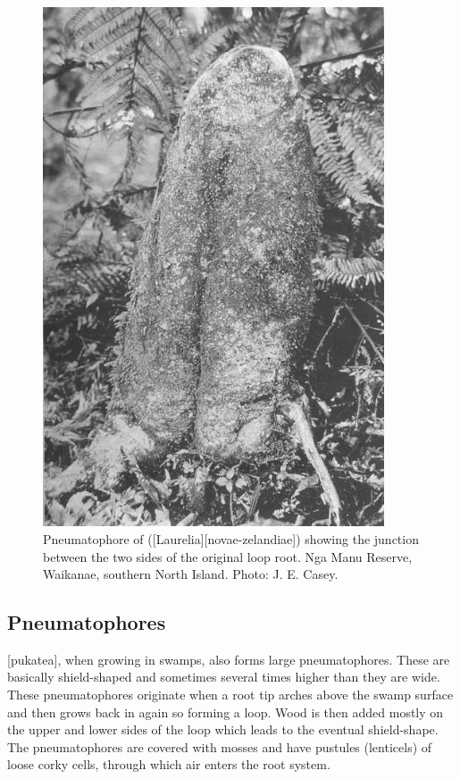 \begin{figure}[!htb]
\begin{minipage}[t]{0.44\textwidth}
    	\includegraphics[width=0.9\textwidth]{graphics/figure11pukatea.jpg}
    	\caption[Pneumatophore of pukatea showing the junction between the two sides of the original loop root]{Pneumatophore of  ([Laurelia][novae-zelandiae]) showing the junction between the two sides of the original loop root.
    	Nga Manu Reserve, Waikanae, southern North Island.
    	Photo:  J. E. Casey.}%
    	\label{fig:11pukatea}
	\end{minipage}
\end{figure}

\subsection{Pneumatophores}

[pukatea], when growing in swamps, also forms large pneumatophores.
These are basically shield-shaped and sometimes several times higher than they are wide.
These pneumatophores originate when a root tip arches above the swamp surface and then grows back in again so forming a loop.
Wood is then added mostly on the upper and lower sides of the loop which leads to the eventual shield-shape.
The pneumatophores are covered with mosses and have pustules (lenticels) of loose corky cells, through which air enters the root system.

